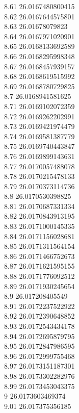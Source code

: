 {8.61	26.0167480800415\\
8.62	26.0167644575801\\
8.63	26.01678079823\\
8.64	26.0167971020901\\
8.65	26.0168133692589\\
8.66	26.0168295998348\\
8.67	26.0168457939157\\
8.68	26.0168619515992\\
8.69	26.0168780729825\\
8.7	26.0168941581625\\
8.71	26.0169102072359\\
8.72	26.0169262202991\\
8.73	26.0169421974479\\
8.74	26.0169581387779\\
8.75	26.0169740443847\\
8.76	26.0169899143631\\
8.77	26.0170057488078\\
8.78	26.0170215478133\\
8.79	26.0170373114736\\
8.8	26.0170530398825\\
8.81	26.0170687331334\\
8.82	26.0170843913195\\
8.83	26.0171000145335\\
8.84	26.0171156028681\\
8.85	26.0171311564154\\
8.86	26.0171466752673\\
8.87	26.0171621595155\\
8.88	26.0171776092512\\
8.89	26.0171930245654\\
8.9	26.017208405549\\
8.91	26.0172237522922\\
8.92	26.0172390648852\\
8.93	26.0172543434178\\
8.94	26.0172695879795\\
8.95	26.0172847986595\\
8.96	26.0172999755468\\
8.97	26.0173151187301\\
8.98	26.0173302282976\\
8.99	26.0173453043375\\
9	26.0173603469374\\
9.01	26.017375356185\\
}
